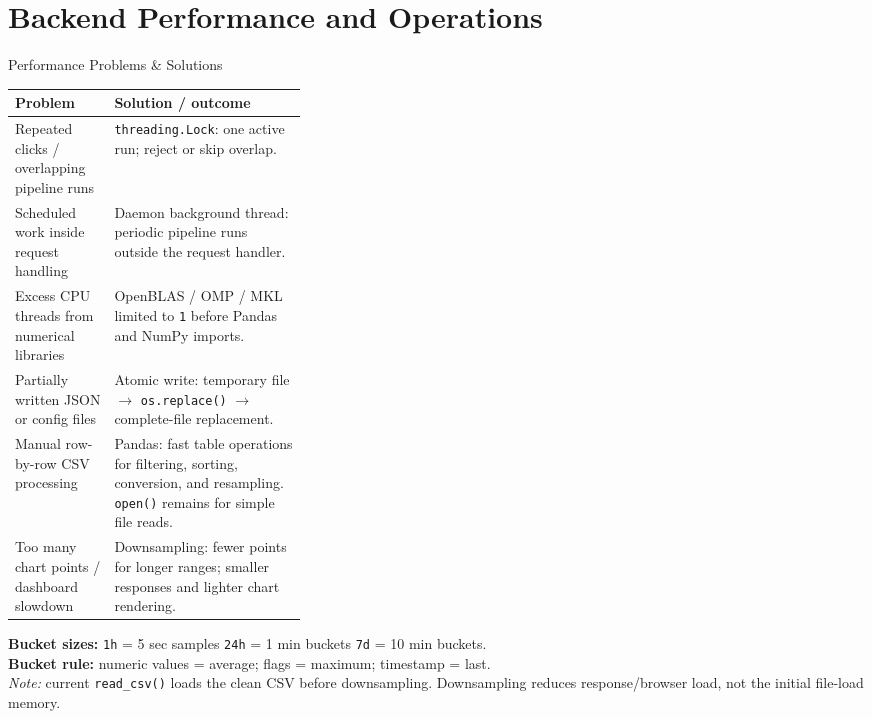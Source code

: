 \documentclass[aspectratio=169,10pt]{beamer}
\begin{document}
\section{Backend Performance and Operations}

\begin{frame}{Performance Problems \& Solutions}
\footnotesize
\begin{tabularx}{\linewidth}{@{}L{0.34\linewidth}Y@{}}
\toprule
\textbf{Problem} & \textbf{Solution / outcome} \\
\midrule
Repeated clicks / overlapping pipeline runs
& \texttt{threading.Lock}: one active run; reject or skip overlap. \\
\addlinespace[1mm]
Scheduled work inside request handling
& Daemon background thread: periodic pipeline runs outside the request handler. \\
\addlinespace[1mm]
Excess CPU threads from numerical libraries
& OpenBLAS / OMP / MKL limited to \texttt{1} before Pandas and NumPy imports. \\
\addlinespace[1mm]
Partially written JSON or config files
& Atomic write: temporary file $\rightarrow$ \texttt{os.replace()} $\rightarrow$ complete-file replacement. \\
\addlinespace[1mm]
Manual row-by-row CSV processing
& Pandas: fast table operations for filtering, sorting, conversion, and resampling. \texttt{open()} remains for simple file reads. \\
\addlinespace[1mm]
Too many chart points / dashboard slowdown
& Downsampling: fewer points for longer ranges; smaller responses and lighter chart rendering. \\
\bottomrule
\end{tabularx}

\vspace{2mm}
\scriptsize
\textbf{Bucket sizes:} \texttt{1h} = 5 sec samples \quad
\texttt{24h} = 1 min buckets \quad
\texttt{7d} = 10 min buckets.\\
\textbf{Bucket rule:} numeric values = average; flags = maximum; timestamp = last.\\
\textit{Note:} current \texttt{read\_csv()} loads the clean CSV before downsampling. Downsampling reduces response/browser load, not the initial file-load memory.
\end{frame}
\end{document}
